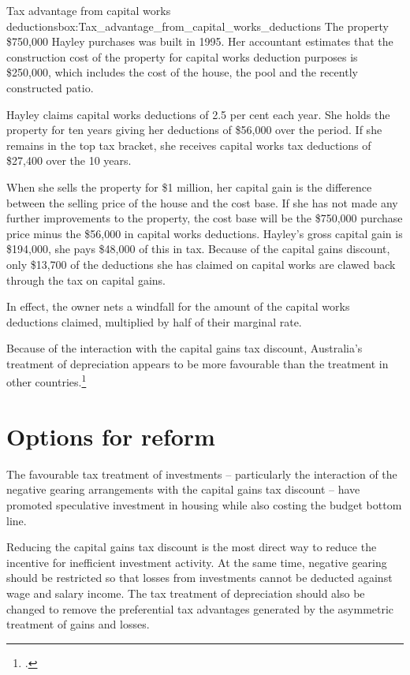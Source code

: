 \documentclass{grattan}\usepackage[]{graphicx}\usepackage[]{color}
\begin{document}
\begin{smallbox}{Tax advantage from capital works deductions}{box:Tax_advantage_from_capital_works_deductions}
The property \$750,000 Hayley purchases was built in 1995. Her accountant estimates that the construction cost of the property for capital works deduction purposes is \$250,000, which includes the cost of the house, the pool and the recently constructed patio. 

Hayley claims capital works deductions of 2.5 per cent each year. She holds the property for ten years giving her deductions of \$56,000 over the period. If she remains in the top tax bracket, she receives capital works tax deductions of \$27,400 over the 10 years. 

When she sells the property for \$1 million, her capital gain is the difference between the selling price of the house and the cost base. If she has not made any further improvements to the property, the cost base will be the \$750,000 purchase price minus the \$56,000 in capital works deductions. Hayley's gross capital gain is \$194,000, she pays \$48,000 of this in tax. Because of the capital gains discount, only \$13,700 of the deductions she has claimed on capital works are clawed back through the tax on capital gains.

In effect, the owner nets a windfall for the amount of the capital works deductions claimed, multiplied by half of their marginal rate.
\end{smallbox}
Because of the interaction with the capital gains tax discount, Australia's treatment of depreciation appears to be more favourable than the treatment in other countries.\footcite{RBA2014}

\section{Options for reform}
The favourable tax treatment of investments -- particularly the interaction of the negative gearing arrangements with the capital gains tax discount -- have promoted speculative investment in housing while also costing the budget bottom line. 

Reducing the capital gains tax discount is the most direct way to reduce the incentive for inefficient investment activity. At the same time, negative gearing should be restricted so that losses from investments cannot be deducted against wage and salary income. The tax treatment of depreciation should also be changed to remove the preferential tax advantages generated by the asymmetric treatment of gains and losses. 
\end{document}
